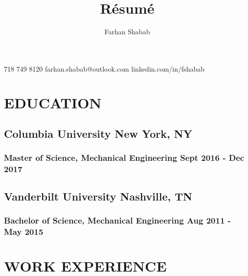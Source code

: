 \documentclass{article}
\makeatletter
\renewcommand{\maketitle}			%
{

	\begin{center}

	{\LARGE\bfseries\color{BrickRed}\MakeUppercase{\theauthor}}

	\vspace{0.4em}

	{\large

		718 749 8120			\textbar\hspace{0.15em}
		farhan.shabab@outlook.com	\textbar\hspace{0.15em}
		linkedin.com/in/fshabab	
	
	}
	
	\end{center}
}
\makeatother
\begin{document}


\title{R\'esum\'e}
\author{Farhan Shabab}
\maketitle



\section{\color{BrickRed} EDUCATION}

\vspace{-0.3em}


\subsection{\textbf{Columbia University} \hfill New York, NY}
\vspace{-0.6em}
\subsubsection{Master of Science, Mechanical Engineering \hfill Sept 2016 - Dec 2017}

\vspace{-0.15em}

\subsection{\textbf{Vanderbilt University} \hfill Nashville, TN}
\vspace{-0.6em}
\subsubsection{Bachelor of Science, Mechanical Engineering \hfill Aug 2011 - May 2015}


\vspace{0.2em}				%



\section{\color{BrickRed} WORK EXPERIENCE}
\end{document}
